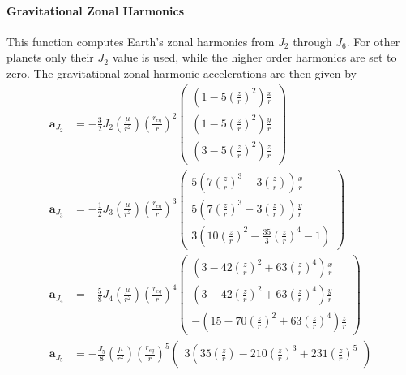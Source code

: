 \paragraph{Gravitational Zonal Harmonics}
This function computes Earth's zonal harmonics from $J_{2}$ through $J_{6}$.  For other planets only their $J_{2}$ value is used, while the higher order harmonics are set to zero.  The gravitational zonal harmonic accelerations are then given by\cite{schaub}
\begin{align}
	\bm a_{J_{2}} &=   -\frac{3}{2} J_{2} 
	\left(\frac{\mu}{r^{2}}\right)
	\left( \frac{r_{eq}}{r}\right)^{2}
	\begin{pmatrix}
		\left(1-5\left(\frac{z}{r}\right)^{2}\right) \frac{x}{r} \\
		\left(1-5\left(\frac{z}{r}\right)^{2}\right) \frac{y}{r} \\
		\left(3-5\left(\frac{z}{r}\right)^{2}\right) \frac{z}{r}
	\end{pmatrix}
	\label{eq:gm:aJ2}
	\\
	\bm a_{J_{3}} &=  -\frac{1}{2} J_{3} 
	\left(\frac{\mu}{r^{2}}\right)
	\left( \frac{r_{eq}}{r}\right)^{3}
	\begin{pmatrix}
		5\left(7 \left(\frac{z}{r}\right)^{3} - 3 \left(\frac{z}{r}\right) 
		\right) \frac{x}{r} \\
		5\left(7 \left(\frac{z}{r}\right)^{3} - 3 \left(\frac{z}{r}\right) 
		\right) \frac{y}{r} \\
		3\left(10\left(\frac{z}{r}\right)^{2} - \frac{35}{3} 
		\left(\frac{z}{r}\right)^{4} - 1 \right) 
	\end{pmatrix}
	\label{eq:gm:aJ3}
	\\
	\bm a_{J_{4}} &=  -\frac{5}{8} J_{4} 
	\left(\frac{\mu}{r^{2}}\right)
	\left( \frac{r_{eq}}{r}\right)^{4}
	\begin{pmatrix}
		\left(3-42 \left(\frac{z}{r}\right)^{2} +63 \left(\frac{z}{r}\right)^{4} 
		\right) \frac{x}{r} \\
		\left(3-42 \left(\frac{z}{r}\right)^{2} +63 \left(\frac{z}{r}\right)^{4} 
		\right) \frac{y}{r} \\
		-\left(15-70\left(\frac{z}{r}\right)^{2} + 63 
		\left(\frac{z}{r}\right)^{4}  \right) \frac{z}{r}
	\end{pmatrix}
	\label{eq:gm:aJ4}
	\\
	\bm a_{J_{5}} &=  -\frac{J_{5}}{8}  
	\left(\frac{\mu}{r^{2}}\right)
	\left( \frac{r_{eq}}{r}\right)^{5}
	\begin{pmatrix}
		3\left(35\left(\frac{z}{r}\right) - 210 
		\left(\frac{z}{r}\right)^{3} +231 \left(\frac{z}{r}\right)^{5}

\end{pmatrix}
\end{align}
